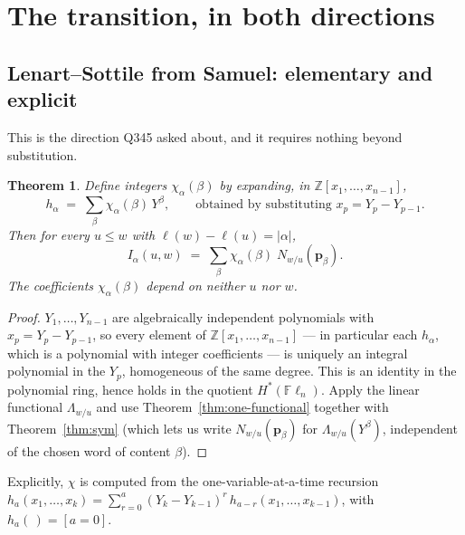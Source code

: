 \documentclass[11pt]{article}
\theoremstyle{plain}
\newtheorem{theorem}{Theorem}[section]
\theoremstyle{definition}
\DeclareMathOperator{\len}{\ell}
\newcommand{\Fl}{\mathbb{F}\ell}
\newcommand{\pv}{\mathbf{p}}
\begin{document}
\section{The transition, in both directions}

\subsection{Lenart--Sottile from Samuel: elementary and explicit}

This is the direction Q345 asked about, and it requires nothing beyond
substitution.

\begin{theorem}\label{thm:chi}
Define integers $\chi_\alpha(\beta)$ by expanding, in
$\mathbb{Z}[x_1,\dots,x_{n-1}]$,
\[
  h_\alpha \;=\; \sum_{\beta}\chi_\alpha(\beta)\,Y^\beta,
  \qquad\text{obtained by substituting } x_p=Y_p-Y_{p-1}.
\]
Then for every $u\le w$ with $\len(w)-\len(u)=|\alpha|$,
\[
  \boxed{\;I_\alpha(u,w)\;=\;\sum_\beta \chi_\alpha(\beta)\;N_{w/u}(\pv_\beta).\;}
\]
The coefficients $\chi_\alpha(\beta)$ depend on neither $u$ nor $w$.
\end{theorem}

\begin{proof}
$Y_1,\dots,Y_{n-1}$ are algebraically independent polynomials with
$x_p=Y_p-Y_{p-1}$, so every element of $\mathbb{Z}[x_1,\dots,x_{n-1}]$ ---
in particular each $h_\alpha$, which is a polynomial with integer coefficients
--- is uniquely an integral polynomial in the $Y_p$, homogeneous of the same
degree. This is an identity in the polynomial ring, hence holds in the quotient
$H^*(\Fl_n)$. Apply the linear functional $\Lambda_{w/u}$ and use
Theorem~\ref{thm:one-functional} together with Theorem~\ref{thm:sym}
(which lets us write $N_{w/u}(\pv_\beta)$ for $\Lambda_{w/u}(Y^\beta)$,
independent of the chosen word of content $\beta$).
\end{proof}

Explicitly, $\chi$ is computed from the one-variable-at-a-time recursion
$h_a(x_1,\dots,x_k)=\sum_{r=0}^{a}(Y_k-Y_{k-1})^r\,h_{a-r}(x_1,\dots,x_{k-1})$,
with $h_a(\,)=[a=0]$.
\end{document}
